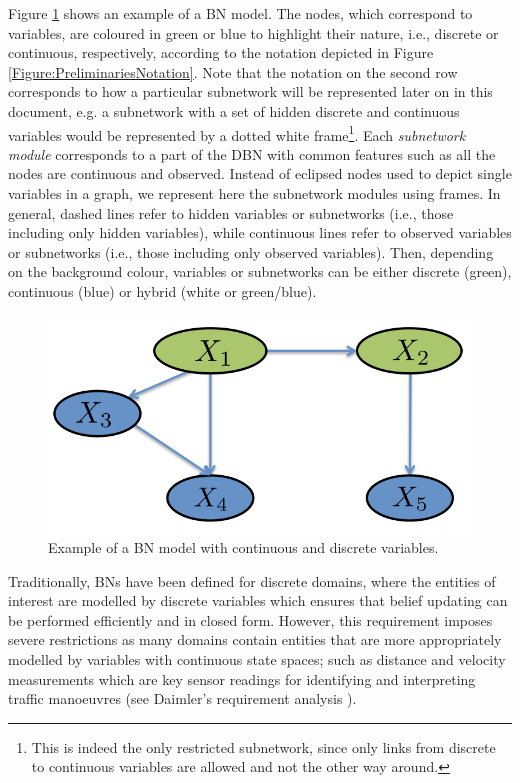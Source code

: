 Figure \ref{Figure:GeneralBayesianNetwork} shows an example of a BN model. The nodes, which correspond to variables, are coloured in green or blue to highlight their nature, i.e., discrete or continuous, respectively, according to the notation depicted in Figure \ref{Figure:PreliminariesNotation}. Note that the notation on the second row corresponds to how a particular subnetwork will be represented later on in this document, e.g. a subnetwork with a set of hidden discrete and continuous variables would be represented by a dotted white frame\footnote{This is indeed the only restricted subnetwork, since only links from discrete to continuous variables are allowed and not the other way around.}. Each \textit{subnetwork module} corresponds to a part of the DBN with common features such as all the nodes are continuous and observed. Instead of eclipsed nodes used to depict single variables in a graph, we represent here the subnetwork modules using frames. In general, dashed lines refer to hidden variables or subnetworks (i.e., those including only hidden variables), while continuous lines refer to observed variables or subnetworks (i.e., those including only observed variables). Then, depending on the background colour, variables or subnetworks can be either discrete (green), continuous (blue) or hybrid (white or green/blue).

\begin{figure}[ht!]
\begin{center}
\includegraphics[scale=0.25]{./figures/PreliminariesGeneralBayesianNetwork}
\caption{\label{Figure:GeneralBayesianNetwork}Example of a BN model with continuous and discrete variables.
}
\end{center}
\end{figure}

Traditionally, BNs have been defined for discrete domains, where the entities of interest are modelled by discrete variables which ensures that belief updating can be performed efficiently and in closed form. However, this requirement imposes severe restrictions as many domains contain entities that are more appropriately modelled by variables with continuous state spaces; such as distance and velocity measurements which are key sensor readings for identifying and interpreting traffic manoeuvres (see Daimler's requirement analysis \cite{Fer14}).

